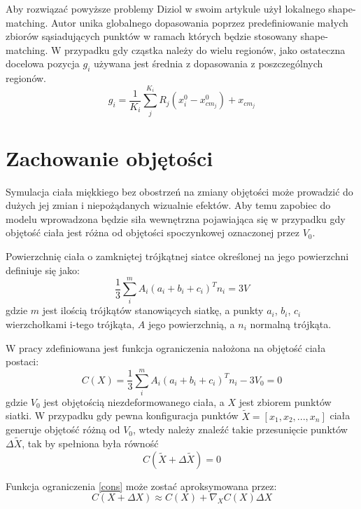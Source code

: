 Aby rozwiązać powyższe problemy Diziol w swoim artykule \cite{diziol} użył
lokalnego shape-matching. Autor unika globalnego dopasowania poprzez
predefiniowanie małych zbiorów sąsiadujących punktów w ramach których będzie
stosowany shape-matching.  W przypadku gdy cząstka należy do wielu regionów,
		  jako ostateczna docelowa pozycja $g_i$ używana jest średnia z
		  dopasowania z poszczególnych regionów.
\begin{equation}
g_i = \frac{1}{K_i} \sum_j^{K_i} R_j (x^0_i - x^0_{cm_j}) + x_{cm_j}
\end{equation}

\section{Zachowanie objętości}
Symulacja ciała miękkiego bez obostrzeń na zmiany objętości może
prowadzić do dużych jej zmian i niepożądanych wizualnie efektów. 
Aby temu zapobiec do modelu wprowadzona będzie siła wewnętrzna pojawiająca się w
przypadku gdy objętość ciała jest różna od objętości spoczynkowej oznaczonej
przez $V_0$.

Powierzchnię ciała o zamkniętej trójkątnej siatce określonej na jego powierzchni definiuje
się jako: \cite{diziol}
\begin{equation}
\label{obj}
\frac{1}{3} \sum_i^m A_i (a_i + b_i + c_i)^T n_i = 3V
\end{equation}
gdzie $m$ jest ilością trójkątów stanowiących siatkę, a punkty $a_i$, $b_i$,
	  $c_i$ wierzchołkami i-tego trójkąta, $A$ jego powierzchnią, a $n_i$
	  normalną trójkąta.

W pracy \cite{diziol} zdefiniowana jest funkcja ograniczenia nałożona na
objętość ciała postaci:
\begin{equation}
\label{cons}
C(X) = \frac{1}{3} \sum_i^m A_i (a_i + b_i + c_i)^T n_i - 3V_0 = 0
\end{equation}
gdzie $V_0$ jest objętością niezdeformowanego ciała, a $X$ jest zbiorem punktów
siatki. W przypadku gdy pewna konfiguracja punktów $\tilde{X} = [x_1, x_2,...,
	x_n] $ ciała generuje
objętość różną od $V_0$, wtedy należy znaleźć takie przesunięcie punktów $\Delta
\tilde{X}$, tak by spełniona była równość 
$$C(\tilde{X} + \Delta \tilde{X}) = 0$$

Funkcja ograniczenia \ref{cons} może zostać aproksymowana przez:
\begin{equation}
\label{e1}
C(X + \Delta X) \approx C(X) + \nabla_X C(X) \Delta X
\end{equation}

